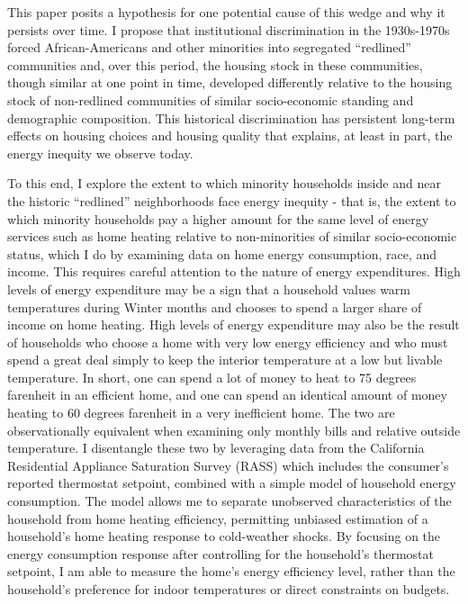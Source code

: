 \documentclass[
]{article}
\begin{document}
This paper posits a hypothesis for one potential cause of this wedge and why it persists over time.
I propose that institutional discrimination in the 1930s-1970s forced African-Americans and other minorities into segregated ``redlined'' communities and,
over this period, the housing stock in these communities, though similar at one point in time, developed differently
relative to the housing stock of non-redlined communities of similar socio-economic standing and demographic
composition. This historical discrimination has persistent long-term effects on housing choices and housing quality
that explains, at least in part, the energy inequity we observe today.

To this end, I explore the extent to which
minority households inside and near the historic ``redlined'' neighborhoods face energy inequity - that is,
the extent to which minority households pay a higher amount for the same
level of energy services such as home heating relative to non-minorities of similar socio-economic status, which I do by
examining data on home energy consumption, race, and income. This requires careful attention to the nature of energy
expenditures. High levels of energy expenditure may be a sign that a household values warm temperatures during Winter
months and chooses to spend a larger share of income on home heating. High levels of energy expenditure may also be the result
of households who choose a home with very low energy efficiency and who must spend a great
deal simply to keep the interior temperature at a low but livable temperature. In short, one can spend a lot of money
to heat to 75 degrees farenheit in an efficient home, and one can spend an identical amount of money heating to 60 degrees farenheit
in a very inefficient home. The two are observationally equivalent when examining only monthly bills and relative outside temperature.
I disentangle these two by leveraging data from the California Residential Appliance Saturation Survey (RASS) which includes the consumer's reported thermostat setpoint,
combined with a simple model of household energy consumption. The model allows me to separate unobserved characteristics of the household
from home heating efficiency, permitting unbiased estimation of a household's home heating response to cold-weather shocks. By focusing on
the energy consumption response after controlling for the household's thermostat setpoint, I am able to measure the home's energy
efficiency level, rather than the household's preference for indoor temperatures or direct constraints on budgets.
\end{document}
